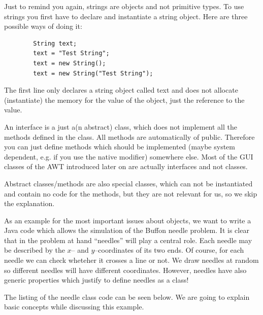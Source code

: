 Just to remind you again, strings are objects and not primitive 
types. To use strings you first have to declare and instantiate a string
object. Here are three possible ways of doing it:
\begin{verbatim}
        String text;
        text = "Test String";
        text = new String();
        text = new String("Test String");
\end{verbatim}
The first line only declares a string object called text and does not
allocate (instantiate) the memory for the value of the object, just
the reference to the value.

An interface is a just a(n abstract) class, which does not implement all the
methods defined in the class. All methods are automatically of public.
Therefore you can just define methods
which should be implemented (maybe system dependent, e.g. if you use
the native modifier) somewhere else.
Most of the GUI classes of the AWT introduced later on are
actually interfaces and not classes.

Abstract classes/methods 
are also special classes, which can not be instantiated
and contain no code for the methods,
but they are not relevant for us, so we skip the explanation.

As an example for the most important issues about objects, we want to
write a Java code which allows the simulation of the Buffon needle
problem. It is clear that in the problem at hand ``needles'' will play
a central role. Each needle may be described by the $x$-- and
$y$--coordinates of  its two ends. Of course, for each needle we can
check wheteher it crosses a line or not. We draw needles at random so
different needles will have different coordinates. However, needles
have also generic properties which justify to define needles as a class!


The listing of the needle class code can be seen below. We are going
to explain basic concepts while discussing this example.


